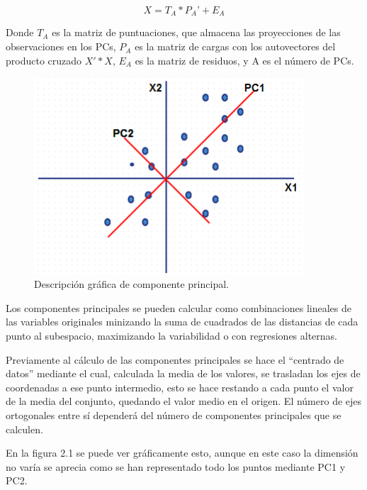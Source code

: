 %
\begin{equation}
X= T_A*P_A’ + E_A
\end{equation} 

Donde $T_A$ es la matriz de puntuaciones, que almacena las proyecciones de las observaciones en los PCs, $P_A$ es la matriz de cargas con los autovectores del producto cruzado $X'*X$, $E_A$ es la matriz de residuos, y A es el número de PCs. 
\bigskip

\begin{figure}[H]
\centering
\includegraphics[width=0.9\textwidth]{imagenes/figuras/2_1.png}
\caption{Descripción gráfica de componente principal.}
\end{figure}

Los componentes principales se pueden calcular como combinaciones lineales de las variables originales minizando la suma de cuadrados de las distancias de cada punto al subespacio, maximizando la variabilidad o con regresiones alternas.
\bigskip

Previamente al cálculo de las componentes principales se hace el “centrado de datos” mediante el cual, calculada la media de los valores, se trasladan los ejes de coordenadas a ese punto intermedio, esto se hace restando a cada punto el valor de la media del conjunto, quedando el valor medio en el origen. El número de ejes ortogonales entre sí dependerá del número de componentes principales que se calculen.

\bigskip

En la figura 2.1 se puede ver gráficamente esto, aunque en este caso la dimensión no varía se aprecia como se han representado todo los puntos mediante PC1 y PC2.

\bigskip

